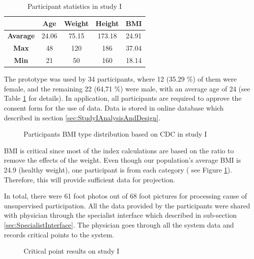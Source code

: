 \begin{table}[htbp]
\begin{center}
\caption{Participant statistics in study I}
\vspace{23pt}
      \begin{tabular}{|c|c|c|c|c|} \hline
          & \textbf{Age} & \textbf{Weight} & \textbf{Height} & \textbf{BMI} \\ \hline
        \textbf{Avarage} & 24.06 & 75.15 & 173.18 & 24.91 \\ \hline
        \textbf{Max} & 48 & 120 & 186 & 37.04 \\ \hline
        \textbf{Min} & 21 & 50 & 160 & 18.14 \\ \hline
    \end{tabular}
\label{tab:StudyIParticipantStatistics}
\end{center}
\end{table}

The prototype was used by 34 participants, where 12 (35.29 \%) of them were female, and the remaining 22 (64,71 \%) were male, with an average age of 24 (see Table \ref{tab:StudyIParticipantStatistics} for details). In application, all participants are required to approve the consent form for the use of data. Data is stored in online database which described in section \ref{sec:StudyIAnalysisAndDesign}. 

\begin{figure}[htbp]
\centering
{}
\caption{Participants BMI type distribution based on CDC in study I}
\label{fig:StudyIParticipantsBMITypeDistribution}
\end{figure}

BMI is critical since most of the index calculations are based on the ratio to remove the effects of the weight. Even though our population's average BMI is 24.9 (healthy weight), one participant is from each category ( see Figure \ref{fig:StudyIParticipantsBMITypeDistribution}). Therefore, this will provide sufficient data for projection.

In total, there were 61 foot photos out of 68 foot pictures for processing cause of unsupervised participation. All the data provided by the participants were shared with physician through the specialist interface which described in sub-section \ref{sec:SpecialistInterface}. The physician goes through all the system data and records critical points to the system.

\begin{figure}[htbp]
\centering
{}
\caption{Critical point results on study I}
\label{fig:StudyICriticalPointResult}
\end{figure}

